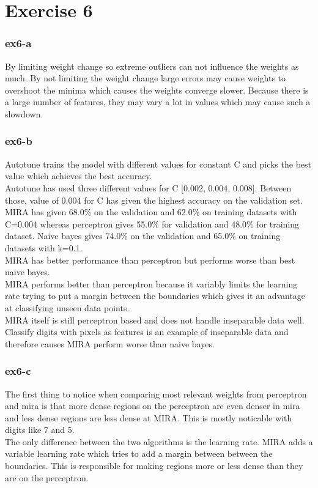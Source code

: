 \section{Exercise 6}
\subsubsection{ex6-a}
By limiting weight change so extreme outliers can not influence the weights as much. By not limiting the weight change
large errors may cause weights to overshoot the minima which causes the weights converge slower. Because there is a large
number of features, they may vary a lot in values which may cause such a slowdown.

\subsubsection{ex6-b}
Autotune trains the model with different values for constant C and picks the best value which achieves the best
accuracy.\\
Autotune has used three different values for C [0.002, 0.004, 0.008]. Between those, value of 0.004 for C has given the
highest accuracy on the validation set. \\
MIRA has given 68.0\% on the validation and 62.0\% on training datasets with C=0.004 whereas perceptron gives 55.0\%
for validation and 48.0\% for training dataset. Naive bayes gives 74.0\% on the validation and 65.0\% on training datasets
with k=0.1.\\
MIRA has better performance than perceptron but performs worse than best naive bayes. \\
MIRA performs better than perceptron because it variably limits the learning rate trying to put a margin between the
boundaries which gives it an advantage at classifying unseen data points. \\
MIRA itself is still perceptron based and does not handle inseparable data well. Classify digits with pixels as features is
an example of inseparable data and therefore causes MIRA perform worse than naive bayes.

\subsubsection{ex6-c}
The first thing to notice when comparing most relevant weights from perceptron and mira is that more dense regions on
the perceptron are even denser in mira and less dense regions are less dense at MIRA. This is mostly noticable with
digits like 7 and 5.\\
The only difference between the two algorithms is the learning rate. MIRA adds a variable learning rate which tries to
add a margin between between the boundaries. This is responsible for making regions more or less dense than they are on
the perceptron.